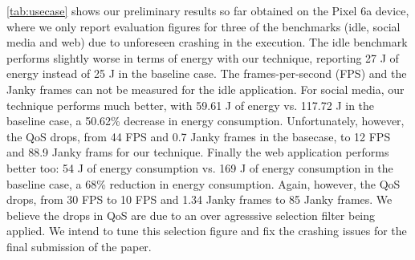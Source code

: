 \documentclass[conference]{IEEEtran}
\begin{document}
\noindent
\cref{tab:usecase} shows our preliminary results so far obtained on the Pixel 6a device, where we only report evaluation figures for three of the benchmarks (idle, social media and web) due to unforeseen crashing in the execution. The idle benchmark performs slightly worse in terms of energy with our technique, reporting 27 J of energy instead of 25 J in the baseline case. The frames-per-second (FPS) and the Janky frames can not be measured for the idle application. For social media, our technique performs much better, with 59.61 J of energy vs. 117.72 J in the baseline case, a 50.62\% decrease in energy consumption. Unfortunately, however, the QoS drops, from 44 FPS and 0.7 Janky frames in the basecase, to 12 FPS and 88.9 Janky frams for our technique. Finally the web application performs better too: 54 J of energy consumption vs. 169 J of energy consumption in the baseline case, a 68\% reduction in energy consumption. Again, however, the QoS drops, from 30 FPS to 10 FPS and 1.34 Janky frames to 85 Janky frames. We believe the drops in QoS are due to an over agresssive selection filter being applied. We intend to tune this selection figure and fix the crashing issues for the final submission of the paper. 


  

 
\end{document}
